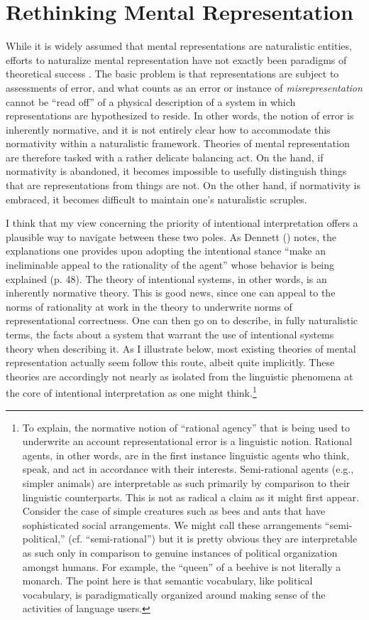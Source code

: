 \section{Rethinking Mental Representation}

While it is widely assumed that mental representations are naturalistic entities, efforts to naturalize mental representation have not exactly been paradigms of theoretical success \citep[][Ch. 3]{Horwich:2005}. The basic problem is that representations are subject to assessments of error, and what counts as an error or instance of \textit{misrepresentation} cannot be ``read off'' of a physical description of a system in which representations are hypothesized to reside. In other words, the notion of error is inherently normative, and it is not entirely clear how to accommodate this normativity within a naturalistic framework. Theories of mental representation are therefore tasked with a rather delicate balancing act. On the hand, if normativity is abandoned, it becomes impossible to usefully distinguish things that are representations from things are not. On the other hand, if normativity is embraced, it becomes difficult to maintain one's naturalistic scruples. 

I think that my view concerning the priority of intentional interpretation offers a plausible way to navigate between these two poles. As Dennett (\citeyear{Dennett:1987}) notes, the explanations one provides upon adopting the intentional stance ``make an ineliminable appeal to the rationality of the agent'' whose behavior is being explained (p. 48). The theory of intentional systems, in other words, is an inherently normative theory. This is good news, since one can appeal to the norms of rationality at work in the theory to underwrite norms of representational correctness. One can then go on to describe, in fully naturalistic terms, the facts about a system that warrant the use of intentional systems theory when describing it. As I illustrate below, most existing theories of mental representation actually seem follow this route, albeit quite implicitly. These theories are accordingly not nearly as isolated from the linguistic phenomena at the core of intentional interpretation as one might think.\footnote{To explain, the normative notion of ``rational agency'' that is being used to underwrite an account representational error is a linguistic notion. Rational agents, in other words, are in the first instance linguistic agents who think, speak, and act in accordance with their interests. Semi-rational agents (e.g., simpler animals) are interpretable as such primarily by comparison to their linguistic counterparts. This is not as radical a claim as it might first appear. Consider the case of simple creatures such as bees and ants that have sophisticated social arrangements. We might call these arrangements ``semi-political,'' (cf. ``semi-rational'') but it is pretty obvious they are interpretable as such only in comparison to genuine instances of political organization amongst humans. For example, the ``queen'' of a beehive is not literally a monarch. The point here is that semantic vocabulary, like political vocabulary, is paradigmatically organized around making sense of the activities of language users.}

